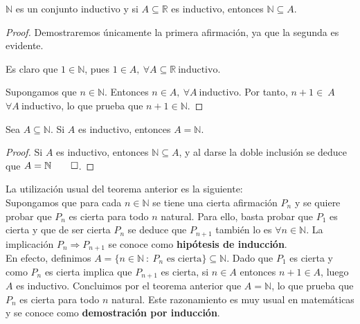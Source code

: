 \begin{teo}
    $\mathbb{N}$ es un conjunto inductivo y si $A \subseteq \mathbb{R}$ es inductivo, entonces $\mathbb{N} \subseteq A$.
\end{teo}
\begin{proof}
    Demostraremos únicamente la primera afirmación, ya que la segunda es evidente.
    
    Es claro que $1 \in \mathbb{N}$, pues $1 \in A, ~\forall A \subseteq \mathbb{R} ~\text{inductivo}$.
    
    Supongamos que $n \in \mathbb{N}$. Entonces $n \in A, ~\forall A ~\text{inductivo}$. Por tanto,
    $n+1 \in~A$ $\forall A ~\text{inductivo}$, lo que prueba que $n+1 \in \mathbb{N}$.
\end{proof}

\begin{teo}
    Sea $A \subseteq \mathbb{N}$. Si $A$ es inductivo, entonces $A = \mathbb{N}$.
\end{teo}
\begin{proof}
    Si $A$ es inductivo, entonces $\mathbb{N} \subseteq A$, y al darse la doble inclusión se deduce que $A = \mathbb{N} \qed$.
\end{proof}

\vspace{0.5cm}
La utilización usual del teorema anterior es la siguiente:\\

Supongamos que para cada $n \in \mathbb{N}$ se tiene una cierta afirmación $P_n$ y se quiere probar que
$P_n$ es cierta para todo $n$ natural. Para ello, basta probar que $P_1$ es cierta y que de ser cierta
$P_n$ se deduce que $P_{n+1}$ también lo es $\forall n \in \mathbb{N}$. La implicación $P_n \Longrightarrow P_{n+1}$
se conoce como \textbf{hipótesis de inducción}.\\

En efecto, definimos $A = \{n \in \mathbb{N} ~:~\text{$P_n$ es cierta}\} \subseteq \mathbb{N}$. Dado que $P_1$ es cierta y como
$P_n$ es cierta implica que $P_{n+1}$ es cierta, si $n \in A$ entonces $n+1 \in A$, luego $A$
es inductivo. Concluimos por el teorema anterior que $A = \mathbb{N}$, lo que prueba que $P_n$ es cierta para todo $n$
natural. Este razonamiento es muy usual en matemáticas y se conoce como \textbf{demostración por inducción}.

